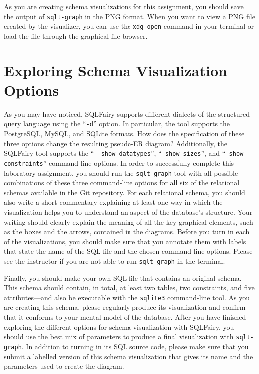 As you are creating schema visualizations for this assignment, you should save the output of {\tt sqlt-graph} in the PNG
format.  When you want to view a PNG file created by the visualizer, you can use the {\tt xdg-open} command in your
terminal or load the file through the graphical file browser.

\vspace*{-.05in}
\section*{Exploring Schema Visualization Options}

As you may have noticed, SQLFairy supports different dialects of the structured query language using the ``{\tt -d}''
option.  In particular, the tool supports the PostgreSQL, MySQL, and SQLite formats.  How does the specification of
these three options change the resulting pseudo-ER diagram? Additionally, the SQLFairy tool supports the ``{\tt
  --show-datatypes}'', ``{\tt --show-sizes}'', and ``{\tt --show-constraints}'' command-line options.  In order to
successfully complete this laboratory assignment, you should run the {\tt sqlt-graph} tool with all possible
combinations of these three command-line options for all six of the relational schemas available in the Git repository.
For each relational schema, you should also write a short commentary explaining at least one way in which the
visualization helps you to understand an aspect of the database's structure. Your writing should clearly explain the
meaning of all the key graphical elements, such as the boxes and the arrows, contained in the diagrams. Before you turn
in each of the visualizations, you should make sure that you annotate them with labels that state the name of the SQL
file and the chosen command-line options. Please see the instructor if you are not able to run {\tt sqlt-graph} in the
terminal.

Finally, you should make your own SQL file that contains an original schema.  This schema should contain, in total, at
least two tables, two constraints, and five attributes---and also be executable with the {\tt sqlite3} command-line
tool. As you are creating this schema, please regularly produce its visualization and confirm that it conforms to your
mental model of the database.  After you have finished exploring the different options for schema visualization with
SQLFairy, you should use the best mix of parameters to produce a final visualization with {\tt sqlt-graph}.  In addition
to turning in its SQL source code, please make sure that you submit a labelled version of this schema visualization that
gives its name and the parameters used to create the diagram. 

